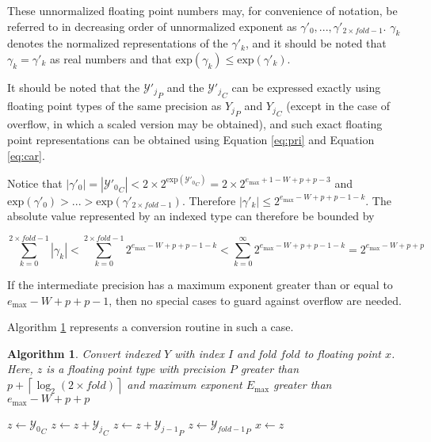 \documentclass[12pt]{article}
\providecommand{\ceil}[1]{\left \lceil #1 \right \rceil }
\providecommand{\exp}{\ensuremath{\text{exp}}}
\providecommand{\max}{\ensuremath{\text{max}}}
\theoremstyle{plain}
\newtheorem{alg}{Algorithm}[section]
\begin{document}
    These unnormalized floating point numbers may, for convenience of notation, be referred to in decreasing order of unnormalized exponent as $\gamma'_0, ..., \gamma'_{2 \times fold - 1}$.
    $\gamma_k$ denotes the normalized representations of the $\gamma'_k$, and it should be noted that $\gamma_k = \gamma'_k$ as real numbers and that $\exp(\gamma_k) \leq \exp(\gamma'_k)$.

    It should be noted that the ${\mathcal{Y}'_j}_P$ and the ${\mathcal{Y}'_j}_C$ can be expressed exactly using floating point types of the same precision as ${Y_j}_P$ and ${Y_j}_C$ (except in the case of overflow, in which a scaled version may be obtained), and such exact floating point representations can be obtained using Equation \ref{eq:pri} and Equation \ref{eq:car}.

    Notice that $|\gamma'_0| = |{\mathcal{Y}'_0}_C| < 2 \times 2^{\exp({\mathcal{Y}'_0}_C)} = 2 \times 2^{e_{\max} + 1 - W + p + p - 3}$ and $\exp(\gamma'_0) > ... > \exp(\gamma'_{2 \times fold - 1})$.  Therefore $|\gamma'_k| \leq 2^{e_{\max} - W + p + p - 1 - k}$. The absolute value represented by an indexed type can therefore be bounded by

    \begin{equation}
      \label{eq:maxindexedvalue}
      \sum\limits_{k = 0}^{2 \times fold - 1} |\gamma_k| < \sum\limits_{k = 0}^{2 \times fold - 1} 2^{e_{\max} - W + p + p - 1 - k} < \sum\limits_{k = 0}^{\infty} 2^{e_{\max} - W + p + p - 1 - k} = 2^{e_{\max} - W + p + p}
    \end{equation}

    If the intermediate precision has a maximum exponent greater than or equal to $e_{\max} - W + p + p - 1$, then no special cases to guard against overflow are needed.

    Algorithm \ref{alg:conv2float} represents a conversion routine in such a case.

    \begin{alg}
      Convert indexed $Y$ with index $I$ and fold $fold$ to floating point $x$. Here, $z$ is a floating point type with precision $P$ greater than $p + \ceil{\log_2(2 \times fold)}$ and maximum exponent $E_{\max}$ greater than $e_{\max} - W + p + p$
      \begin{algorithmic}
          \State $z \gets {\mathcal{Y}_0}_C$
            \State $z \gets z + {\mathcal{Y}_j}_C$
            \State $z \gets z + {\mathcal{Y}_{j - 1}}_P$
          \EndFor
          \State $z \gets {\mathcal{Y}_{fold - 1}}_P$
          \State $x \gets z$
        \EndFunction
      \end{algorithmic}
      \label{alg:conv2float}
    \end{alg}
\end{document}
